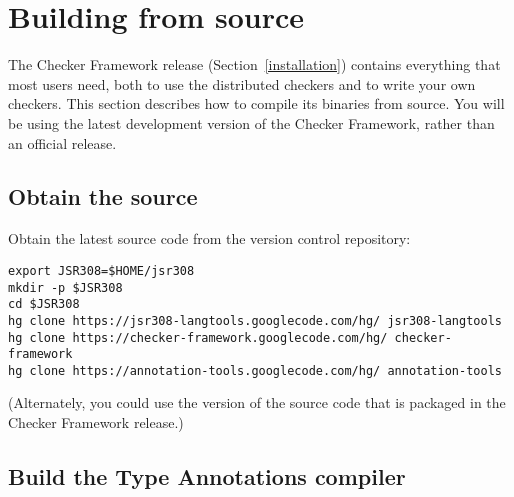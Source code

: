 \section{Building from source\label{build-source}}

The Checker Framework release (Section~\ref{installation}) contains
everything that most users need, both to use the distributed checkers and
to write your own checkers.  This section describes how to compile its
binaries from source.  You will be using the latest development version of
the Checker Framework, rather than an official release.



\subsection{Obtain the source}

Obtain the latest source code from the version control repository:

\begin{Verbatim}
export JSR308=$HOME/jsr308
mkdir -p $JSR308
cd $JSR308
hg clone https://jsr308-langtools.googlecode.com/hg/ jsr308-langtools
hg clone https://checker-framework.googlecode.com/hg/ checker-framework
hg clone https://annotation-tools.googlecode.com/hg/ annotation-tools
\end{Verbatim}

\noindent
(Alternately, you could use the version of the source code that is packaged
in the Checker Framework release.)



\subsection{Build the Type Annotations compiler}


